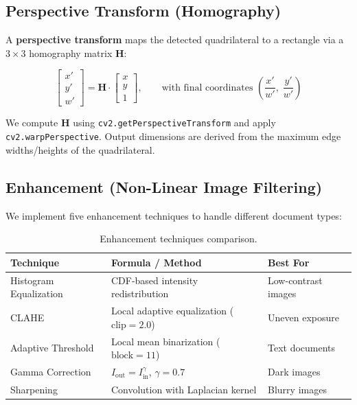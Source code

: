 \documentclass[11pt,a4paper]{article}
\begin{document}
\subsection{Perspective Transform (Homography)}

A \textbf{perspective transform} maps the detected quadrilateral to a rectangle via a $3 \times 3$ homography matrix $\mathbf{H}$:

\begin{equation}
\begin{bmatrix} x' \\ y' \\ w' \end{bmatrix}
= \mathbf{H} \cdot
\begin{bmatrix} x \\ y \\ 1 \end{bmatrix},
\qquad
\text{with final coordinates } \left(\frac{x'}{w'},\; \frac{y'}{w'}\right)
\end{equation}

We compute $\mathbf{H}$ using \texttt{cv2.getPerspectiveTransform} and apply \texttt{cv2.warpPerspective}. Output dimensions are derived from the maximum edge widths/heights of the quadrilateral.

\subsection{Enhancement (Non-Linear Image Filtering)}

We implement five enhancement techniques to handle different document types:

\begin{table}[H]
\centering
\small
\begin{tabular}{@{}lll@{}}
\toprule
\textbf{Technique} & \textbf{Formula / Method} & \textbf{Best For} \\
\midrule
Histogram Equalization & CDF-based intensity redistribution & Low-contrast images \\
CLAHE & Local adaptive equalization ($\text{clip}=2.0$) & Uneven exposure \\
Adaptive Threshold & Local mean binarization ($\text{block}=11$) & Text documents \\
Gamma Correction & $I_{\text{out}} = I_{\text{in}}^{\gamma}$, $\gamma=0.7$ & Dark images \\
Sharpening & Convolution with Laplacian kernel & Blurry images \\
\bottomrule
\end{tabular}
\caption{Enhancement techniques comparison.}
\end{table}
\end{document}
